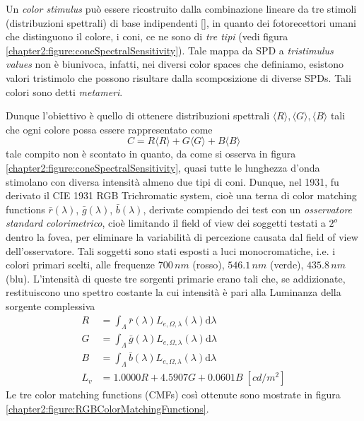 Un \textit{color stimulus} pu\`o essere ricostruito dalla combinazione lineare da tre stimoli (distribuzioni spettrali) di base indipendenti 
[\cite{color}], in quanto dei fotorecettori umani che distinguono il colore, i coni, ce ne sono di \textit{tre tipi} (vedi figura 
\ref{chapter2:figure:coneSpectralSensitivity}). Tale mappa da SPD a \textit{tristimulus values} non \`e biunivoca, infatti, nei diversi color 
spaces che definiamo, esistono valori tristimolo che possono risultare dalla scomposizione di diverse SPDs. Tali colori 
sono detti \textit{metameri}.\par 
Dunque l'obiettivo \`e quello di ottenere distribuzioni spettrali $\langle R\rangle, \langle G\rangle, \langle B\rangle$ tali che ogni colore 
possa essere rappresentato come
\begin{equation}\label{chapter2:colorimetry:color}
	C = R\langle R\rangle + G\langle G\rangle + B\langle B\rangle
\end{equation}
tale compito non \`e scontato in quanto, da come si osserva in figura \ref{chapter2:figure:coneSpectralSensitivity}, quasi tutte le lunghezza d'onda 
stimolano con diversa intensit\`a almeno due tipi di coni. Dunque, nel 1931, fu derivato il CIE 1931 RGB Trichromatic system, cio\`e una terna di 
color matching functions $\bar{r}(\lambda)$, $\bar{g}(\lambda)$, $\bar{b}(\lambda)$, derivate compiendo dei test con un 
\textit{osservatore standard colorimetrico}, cio\`e limitando il field of view dei soggetti testati a $2^o$ dentro la fovea, per eliminare la 
variabilit\`a di percezione causata dal field of view dell'osservatore. Tali soggetti sono stati esposti a luci monocromatiche, i.e. i colori primari 
scelti, alle frequenze $700\,\si{nm}$ (rosso), $546.1\,\si{nm}$ (verde), $435.8\,\si{nm}$ (blu). L'intensit\`a di queste tre sorgenti primarie erano
tali che, se addizionate, restituiscono uno spettro costante la cui intensit\`a \`e pari alla Luminanza della sorgente complessiva 
\begin{align}
	R &= \int_\Lambda \bar{r}(\lambda)L_{e,\Omega,\lambda}(\lambda)\mathrm{d}\lambda\\
	G &= \int_\Lambda \bar{g}(\lambda)L_{e,\Omega,\lambda}(\lambda)\mathrm{d}\lambda\\
	B &= \int_\Lambda \bar{b}(\lambda)L_{e,\Omega,\lambda}(\lambda)\mathrm{d}\lambda\\
	L_v &= 1.0000 R + 4.5907 G + 0.0601 B\;[\si{cd/m^2}]
\end{align}
Le tre color matching functions (CMFs) cos\`i 
ottenute sono mostrate in figura \ref{chapter2:figure:RGBColorMatchingFunctions}.\par
